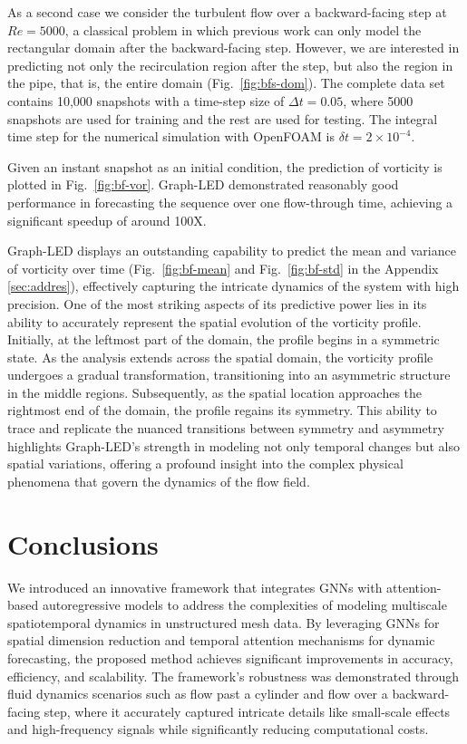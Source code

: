 \documentclass{article}
\begin{document}
As a second case we consider the turbulent flow over a backward-facing step at $Re=5000$, a classical problem in which previous work \cite{geneva2020multi, gao2024generative} can only model the rectangular domain after the backward-facing step. However, we are interested in predicting not only the recirculation region after the step, but also the region in the pipe, that is, the entire domain (Fig.~\ref{fig:bfs-dom}). The complete data set contains 10,000 snapshots with a time-step size of $\Delta t = 0.05$, where 5000 snapshots are used for training and the rest are used for testing. The integral time step for the numerical simulation with OpenFOAM is $\delta t = 2\times 10^{-4}$. 

Given an instant snapshot as an initial condition, the prediction of vorticity is plotted in Fig.~\ref{fig:bf-vor}. Graph-LED demonstrated reasonably good performance in forecasting the sequence over one flow-through time, {achieving a significant speedup of around 100X}.

Graph-LED displays an outstanding capability to predict the mean and variance of vorticity over time (Fig.~\ref{fig:bf-mean} and Fig.~\ref{fig:bf-std} in the Appendix \ref{sec:addres}), effectively capturing the intricate dynamics of the system with high precision. One of the most striking aspects of its predictive power lies in its ability to accurately represent the spatial evolution of the vorticity profile. Initially, at the leftmost part of the domain, the profile begins in a symmetric state. As the analysis extends across the spatial domain, the vorticity profile undergoes a gradual transformation, transitioning into an asymmetric structure in the middle regions. Subsequently, as the spatial location approaches the rightmost end of the domain, the profile regains its symmetry. This ability to trace and replicate the nuanced transitions between symmetry and asymmetry highlights Graph-LED's strength in modeling not only temporal changes but also spatial variations, offering a profound insight into the complex physical phenomena that govern the dynamics of the flow field.

\section{Conclusions}
We introduced an innovative framework that integrates GNNs with attention-based autoregressive models to address the complexities of modeling multiscale spatiotemporal dynamics in unstructured mesh data. By leveraging GNNs for spatial dimension reduction and temporal attention mechanisms for dynamic forecasting, the proposed method achieves significant improvements in accuracy, efficiency, and scalability. The framework's robustness was demonstrated through fluid dynamics scenarios such as flow past a cylinder and flow over a backward-facing step, where it accurately captured intricate details like small-scale effects and high-frequency signals while significantly reducing computational costs.
\end{document}
